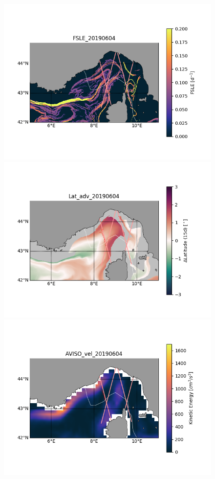 \documentclass[12pt,a4paper]{article}
\begin{document}
\begin{figure}[h!]
\includegraphics[scale=0.5]{Figures/FSLE.png}
\includegraphics[scale=0.5]{Figures/Lat_adv.png}
\includegraphics[scale=0.5]{Figures/AVISO_vel.png}

\end{figure}
\end{document}
